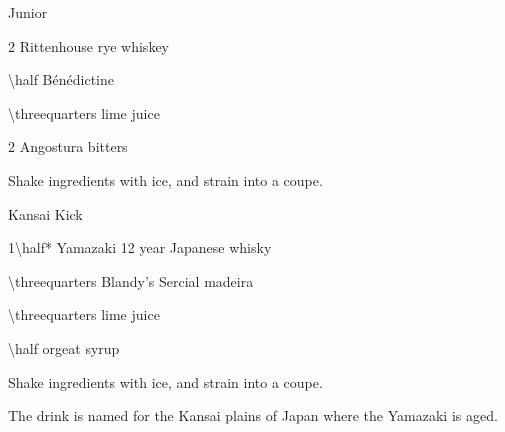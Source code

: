 
\begin{PDTCocktail*}{Junior}
	\begin{Ingredients}
	\item \SI{2}{\oz} Rittenhouse rye whiskey
	\item \SI{\half}{\oz} B\'en\'edictine
	\item \SI{\threequarters}{\oz} lime juice
	\item 2 \si{\dashes} Angostura bitters
	\end{Ingredients}
	
	\begin{Instructions}
	Shake ingredients with ice, and strain into a coupe.
	\end{Instructions}
\end{PDTCocktail*}

\begin{PDTCocktail}{Kansai Kick}
	\begin{Ingredients}
	\item \SI{1\half*}{\oz} Yamazaki 12 year Japanese whisky
	\item \SI{\threequarters}{\oz} Blandy's Sercial madeira
	\item \SI{\threequarters}{\oz} lime juice
	\item \SI{\half}{\oz} orgeat syrup
	\end{Ingredients}
	
	\begin{Instructions}
	Shake ingredients with ice, and strain into a coupe.
	
	The drink is named for the Kansai plains of Japan where the Yamazaki is aged.
	\end{Instructions}
\end{PDTCocktail}

